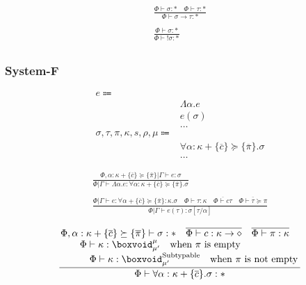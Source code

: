 \documentclass {article}
\begin{document}
\begin{gather*}
\frac
{\Phi \vdash \sigma : * \quad \Phi \vdash \tau : *}
{\Phi \vdash \sigma \to \tau : * } \\
\\
\frac
{\Phi \vdash \sigma : * }
{\Phi \vdash !\sigma : * } \\
\end{gather*}

\subsubsection{System-F}
\begin{align*}
e \Coloneqq & \\
& \Lambda \alpha. e \tag{Type Lambda} \\
& e (\sigma) \tag{Type Application} \\
& \dots \\
\sigma, \tau, \pi, \kappa, s, \rho, \mu \Coloneqq & \\
& \forall \alpha : \kappa + \{ \overline c \} \succeq \{ \overline \pi \}. \sigma \tag{Type Poly} \\
& \dots
\end{align*}

\begin{gather*}
\frac
{\Phi, \alpha : \kappa + \{ \overline c \} \succeq \{ \overline \pi \} | \Gamma \vdash e : \sigma}
{\Phi | \Gamma \vdash \Lambda \alpha. e : \forall \alpha : \kappa + \{ \overline c\} \succeq \{ \overline \pi \} . \sigma } \\
\\
\frac
{\Phi | \Gamma \vdash e : \forall \alpha + \{ \overline c \} \succeq \{ \overline \pi \} : \kappa. \sigma \quad \Phi \vdash \tau : \kappa \quad \overline {\Phi \vdash c \tau} \quad \overline { \Phi \vdash \tau \succeq \pi }}
{\Phi | \Gamma \vdash e (\tau) : \sigma [\tau/\alpha] }
\end{gather*}

\begin{gather*}
\frac
{\splitfrac{\Phi, \alpha : \kappa + \{ \overline c \} \succeq \{ \overline \pi \}\vdash \sigma : * \quad \overline { \Phi \vdash c : \kappa \to \diamond} \quad \overline { \Phi \vdash \pi : \kappa}}
{\splitfrac{\Phi \vdash \kappa : \boxvoid^\mu_{\mu'} \quad \text{when $ \pi $ is empty}}
{\Phi \vdash \kappa : \boxvoid^\text{Subtypable}_{\mu'} \quad \text{when $ \pi $ is not empty} }}}
{\Phi \vdash \forall \alpha : \kappa + \{ \overline c \}. \sigma : * } \\
\end{gather*}
\end{document}
